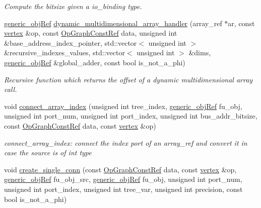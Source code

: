\begin{DoxyCompactItemize}
\begin{DoxyCompactList}\small\item\em Compute the bitsize given a io\+\_\+binding type. \end{DoxyCompactList}\item 
\hyperlink{generic__obj_8hpp_acb533b2ef8e0fe72e09a04d20904ca81}{generic\+\_\+obj\+Ref} \hyperlink{classmux__connection__binding_a89ede1ce1d15207461df7fdf816a4a16}{dynamic\+\_\+multidimensional\+\_\+array\+\_\+handler} (array\+\_\+ref $\ast$ar, const \hyperlink{graph_8hpp_abefdcf0544e601805af44eca032cca14}{vertex} \&op, const \hyperlink{op__graph_8hpp_a9a0b240622c47584bee6951a6f5de746}{Op\+Graph\+Const\+Ref} data, unsigned int \&base\+\_\+address\+\_\+index\+\_\+pointer, std\+::vector$<$ unsigned int $>$ \&recursive\+\_\+indexes\+\_\+values, std\+::vector$<$ unsigned int $>$ \&dims, \hyperlink{generic__obj_8hpp_acb533b2ef8e0fe72e09a04d20904ca81}{generic\+\_\+obj\+Ref} \&global\+\_\+adder, const bool is\+\_\+not\+\_\+a\+\_\+phi)
\begin{DoxyCompactList}\small\item\em Recursive function which returns the offset of a dynamic multidimensional array call. \end{DoxyCompactList}\item 
void \hyperlink{classmux__connection__binding_ad251a8347349b835c134d933a8f02048}{connect\+\_\+array\+\_\+index} (unsigned int tree\+\_\+index, \hyperlink{generic__obj_8hpp_acb533b2ef8e0fe72e09a04d20904ca81}{generic\+\_\+obj\+Ref} fu\+\_\+obj, unsigned int port\+\_\+num, unsigned int port\+\_\+index, unsigned int bus\+\_\+addr\+\_\+bitsize, const \hyperlink{op__graph_8hpp_a9a0b240622c47584bee6951a6f5de746}{Op\+Graph\+Const\+Ref} data, const \hyperlink{graph_8hpp_abefdcf0544e601805af44eca032cca14}{vertex} \&op)
\begin{DoxyCompactList}\small\item\em connect\+\_\+array\+\_\+index\+: connect the index port of an array\+\_\+ref and convert it in case the source is of int type \end{DoxyCompactList}\item 
void \hyperlink{classmux__connection__binding_ae17b2f5ce5c792eabdf7d5343e866b05}{create\+\_\+single\+\_\+conn} (const \hyperlink{op__graph_8hpp_a9a0b240622c47584bee6951a6f5de746}{Op\+Graph\+Const\+Ref} data, const \hyperlink{graph_8hpp_abefdcf0544e601805af44eca032cca14}{vertex} \&op, \hyperlink{generic__obj_8hpp_acb533b2ef8e0fe72e09a04d20904ca81}{generic\+\_\+obj\+Ref} fu\+\_\+obj\+\_\+src, \hyperlink{generic__obj_8hpp_acb533b2ef8e0fe72e09a04d20904ca81}{generic\+\_\+obj\+Ref} fu\+\_\+obj, unsigned int port\+\_\+num, unsigned int port\+\_\+index, unsigned int tree\+\_\+var, unsigned int precision, const bool is\+\_\+not\+\_\+a\+\_\+phi)

\end{DoxyCompactItemize}
